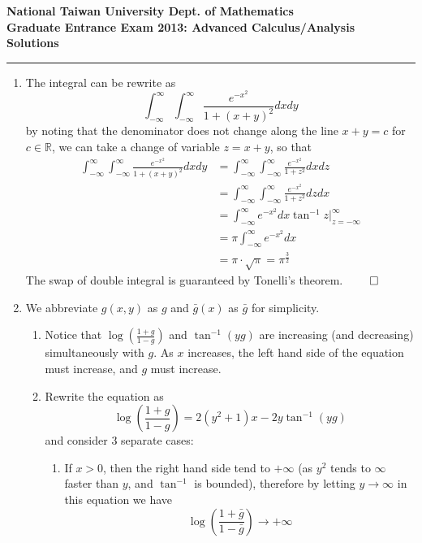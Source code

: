 
\begin{center}
    \textbf{National Taiwan University Dept. of Mathematics \\ Graduate Entrance Exam 2013: Advanced Calculus/Analysis \\ Solutions} 
    \noindent\rule{\textwidth}{0.4pt}
\end{center}
\begin{enumerate}
    \item The integral can be rewrite as
    \[
    \int_{-\infty}^\infty \int_{-\infty}^\infty \frac{e^{-x^2}}{1+(x+y)^2}dxdy
    \]
    by noting that the denominator does not change along the line $x+y=c$ for $c \in \mathbb{R}$, we can take a change of variable $z = x+y$, so that
    \begin{align*}
        \int_{-\infty}^\infty \int_{-\infty}^\infty \frac{e^{-x^2}}{1+(x+y)^2}dxdy &= \int_{-\infty}^\infty \int_{-\infty}^\infty \frac{e^{-x^2}}{1+z^2}dxdz \\ 
        &= \int_{-\infty}^\infty \int_{-\infty}^\infty \frac{e^{-x^2}}{1+z^2}dzdx \\
        &= \int_{-\infty}^\infty e^{-x^2} dx \tan^{-1}z\vert^\infty_{z = -\infty} \\ 
        &= \pi \int_{-\infty}^\infty e^{-x^2} dx  \\ 
        &= \pi \cdot \sqrt{\pi} =  \pi^{\frac{3}{2}}
    \end{align*}
    The swap of double integral is guaranteed by Tonelli's theorem. $\qed$
    \item We abbreviate $g(x,y)$ as $g$ and $\bar{g}(x)$ as $\bar{g}$ for simplicity.
    \begin{enumerate}
        \item Notice that $\log\left(\frac{1+g}{1-g}\right)$ and $\tan^{-1}(yg)$ are increasing (and decreasing) simultaneously with $g$. As $x$ increases, the left hand side of the equation must increase, and $g$ must increase.
        \item Rewrite the equation as
        \[
        \log\left(\frac{1+g}{1-g}\right) = 2(y^2+1)x - 2y \tan^{-1}(yg)
        \]
        and consider 3 separate cases:
        \begin{enumerate}
            \item If $x > 0$, then the right hand side tend to $+\infty$ (as $y^2$ tends to $\infty$ faster than $y$, and $\tan^{-1}$ is bounded), therefore by letting $y \to \infty$ in this equation we have
            \[
            \log\left(\frac{1+\bar{g}}{1-\bar{g}}\right) \to +\infty
            \]

\end{enumerate}
\end{enumerate}
\end{enumerate}
